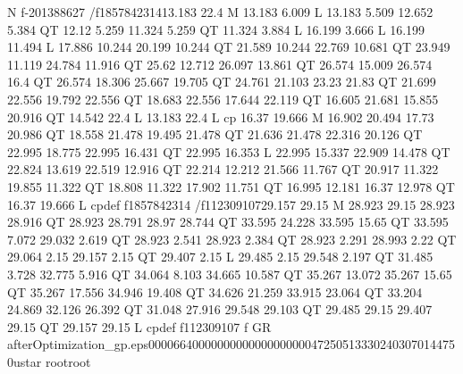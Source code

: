 N
f-201388627
/f1857842314{13.183 22.4 M
13.183 6.009 L
13.183 5.509 12.652 5.384 QT
12.12 5.259 11.324 5.259 QT
11.324 3.884 L
16.199 3.666 L
16.199 11.494 L
17.886 10.244 20.199 10.244 QT
21.589 10.244 22.769 10.681 QT
23.949 11.119 24.784 11.916 QT
25.62 12.712 26.097 13.861 QT
26.574 15.009 26.574 16.4 QT
26.574 18.306 25.667 19.705 QT
24.761 21.103 23.23 21.83 QT
21.699 22.556 19.792 22.556 QT
18.683 22.556 17.644 22.119 QT
16.605 21.681 15.855 20.916 QT
14.542 22.4 L
13.183 22.4 L
cp
16.37 19.666 M
16.902 20.494 17.73 20.986 QT
18.558 21.478 19.495 21.478 QT
21.636 21.478 22.316 20.126 QT
22.995 18.775 22.995 16.431 QT
22.995 16.353 L
22.995 15.337 22.909 14.478 QT
22.824 13.619 22.519 12.916 QT
22.214 12.212 21.566 11.767 QT
20.917 11.322 19.855 11.322 QT
18.808 11.322 17.902 11.751 QT
16.995 12.181 16.37 12.978 QT
16.37 19.666 L
cp}def
f1857842314
/f112309107{29.157 29.15 M
28.923 29.15 28.923 28.916 QT
28.923 28.791 28.97 28.744 QT
33.595 24.228 33.595 15.65 QT
33.595 7.072 29.032 2.619 QT
28.923 2.541 28.923 2.384 QT
28.923 2.291 28.993 2.22 QT
29.064 2.15 29.157 2.15 QT
29.407 2.15 L
29.485 2.15 29.548 2.197 QT
31.485 3.728 32.775 5.916 QT
34.064 8.103 34.665 10.587 QT
35.267 13.072 35.267 15.65 QT
35.267 17.556 34.946 19.408 QT
34.626 21.259 33.915 23.064 QT
33.204 24.869 32.126 26.392 QT
31.048 27.916 29.548 29.103 QT
29.485 29.15 29.407 29.15 QT
29.157 29.15 L
cp}def
f112309107
f
GR
                                                                                                                                                                                                                                                                     afterOptimization_gp.eps                                                                            0000664 0000000 0000000 00000472505 13330240307 014475  0                                                                                                    ustar   root                            root                                                                                                                                                                                                                   %
